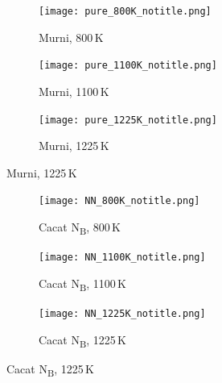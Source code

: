 \begin{figure}[htbp]
  \centering
  \begin{subfigure}{0.9\textwidth}
    \centering
    \texttt{[image: pure\_800K\_notitle.png]}
    \caption{Murni, 800 K}
    \label{subfig:rdf_msd_pure_800k}
  \end{subfigure}
  \vspace{1em}
  \begin{subfigure}{0.9\textwidth}
    \centering
    \texttt{[image: pure\_1100K\_notitle.png]}
    \caption{Murni, 1100 K}
    \label{subfig:rdf_msd_pure_1100k}
  \end{subfigure}
  \vspace{1em}
  \begin{subfigure}{0.9\textwidth}
    \centering
    \texttt{[image: pure\_1225K\_notitle.png]}
    \caption{Murni, 1225 K}
    \label{subfig:rdf_msd_pure_1225k}
  \end{subfigure}
  \label{fig:rdf_msd_grid}
\end{figure}

\begin{figure}[htbp]\ContinuedFloat
  \centering
  \begin{subfigure}{0.9\textwidth}
    \centering
    \texttt{[image: NN\_800K\_notitle.png]}
    \caption{Cacat N\textsubscript{B}, 800 K}
    \label{subfig:rdf_msd_nn_800k}
  \end{subfigure}
  \vspace{1em}
  \begin{subfigure}{0.9\textwidth}
    \centering
    \texttt{[image: NN\_1100K\_notitle.png]}
    \caption{Cacat N\textsubscript{B}, 1100 K}
    \label{subfig:rdf_msd_nn_1100k}
  \end{subfigure}
  \vspace{1em}
  \begin{subfigure}{0.9\textwidth}
    \centering
    \texttt{[image: NN\_1225K\_notitle.png]}
    \caption{Cacat N\textsubscript{B}, 1225 K}
    \label{subfig:rdf_msd_nn_1225k}
  \end{subfigure}
\end{figure}

